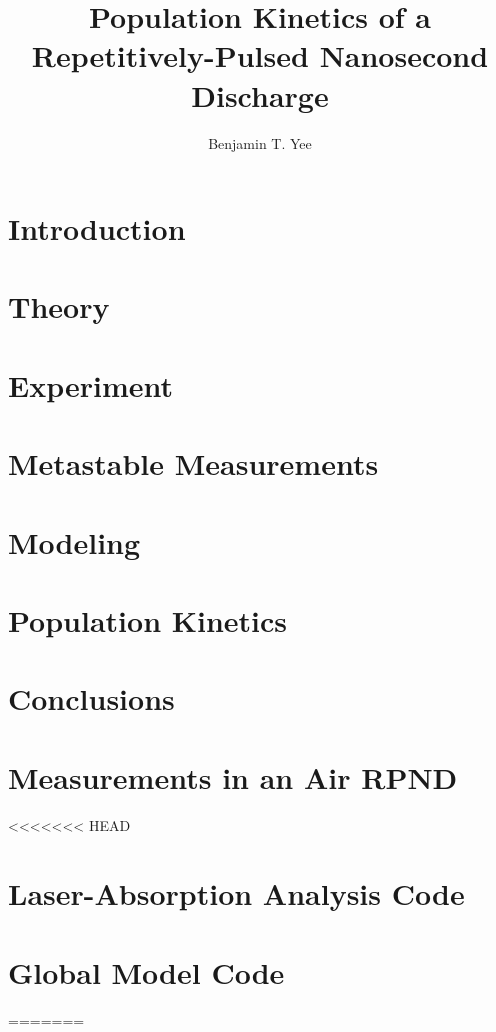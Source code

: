 \documentclass[12pt]{./tex/thesis-umich}
\title{Population Kinetics of a Repetitively-Pulsed Nanosecond Discharge}
\author{Benjamin T. Yee}
\begin{document}
  \chapter{Introduction}\label{chp:introduction}
    
  
  \chapter{Theory}\label{chp:theory}
    

  \chapter{Experiment}\label{chp:experiment}
    

  \chapter{Metastable Measurements}\label{chp:metastables}
    
  
  \chapter{Modeling}\label{chp:modeling}
    

  \chapter{Population Kinetics}\label{chp:emissions}
    

  \chapter{Conclusions}\label{chp:conclusions}

  \appendix
    \chapter{Measurements in an Air RPND}\label{chp:nasa}
      
<<<<<<< HEAD

    \chapter{Laser-Absorption Analysis Code}

    \chapter{Global Model Code}
=======
\end{document}
